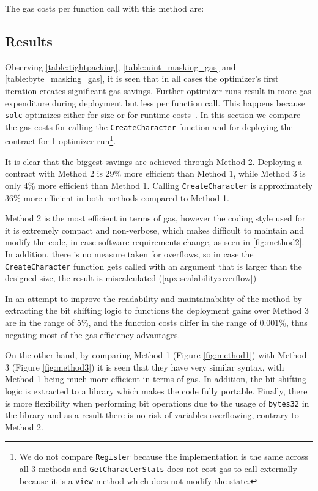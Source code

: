 The gas costs per function call with this method are: 


\subsection{Results}\label{ch:scalability:results}
Observing \ref{table:tightpacking}, \ref{table:uint_masking_gas} and \ref{table:byte_masking_gas},  it is seen that in all cases the optimizer's first iteration creates significant gas savings. Further optimizer runs result in more gas expenditure during deployment but less per function call. This happens because \texttt{solc} optimizes either for size or for runtime costs~\cite{optimizer-tradeoff}. In this section we compare the gas costs for calling the \texttt{CreateCharacter} function and for deploying the contract for 1 optimizer run\footnote{We do not compare \texttt{Register} because the implementation is the same across all 3 methods and \texttt{GetCharacterStats} does not cost gas to call externally because it is a \texttt{view} method which does not modify the state.}. 



It is clear that the biggest savings are achieved through Method 2. Deploying a contract with Method 2 is 29\% more efficient than Method 1, while Method 3 is only 4\% more efficient than Method 1. Calling \texttt{CreateCharacter} is approximately 36\% more efficient in both methods compared to Method 1. 

Method 2 is the most efficient in terms of gas, however the coding style used for it is extremely compact and non-verbose, which makes difficult to maintain and modify the code, in case software requirements change, as seen in \ref{fig:method2}. In addition, there is no measure taken for overflows, so in case the \texttt{CreateCharacter} function gets called with an argument that is larger than the designed size, the result is miscalculated (\ref{apx:scalability:overflow}) 

In an attempt to improve the readability and maintainability of the method by extracting the bit shifting logic to functions the deployment gains over Method 3 are in the range of 5\%, and the function costs differ in the range of 0.001\%, thus negating most of the gas efficiency advantages.


On the other hand, by comparing Method 1 (Figure \ref{fig:method1}) with Method 3 (Figure \ref{fig:method3}) it is seen that they have very similar syntax, with Method 1 being much more efficient in terms of gas. In addition, the bit shifting logic is extracted to a library which makes the code fully portable. Finally, there is more flexibility when performing bit operations due to the usage of \texttt{bytes32} in the library and as a result there is no risk of variables overflowing, contrary to Method 2.

